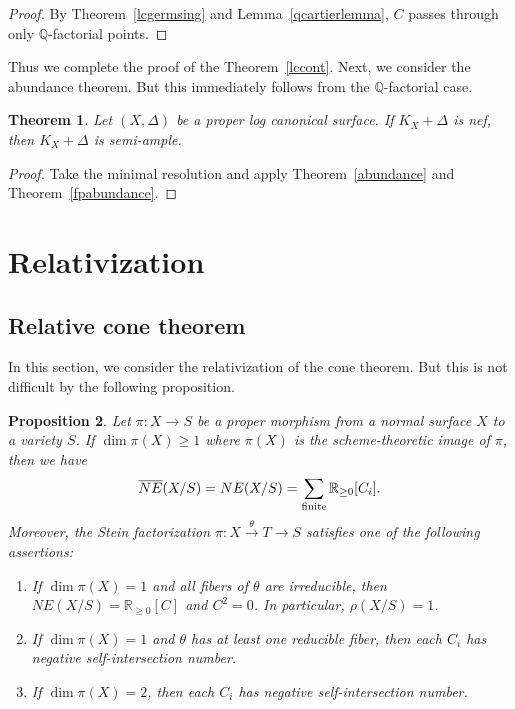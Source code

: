 \documentclass[12pt,twoside]{amsart}
\newtheorem{thm}{Theorem}[section]
\newtheorem{prop}[thm]{Proposition}
\theoremstyle{definition}
\newcommand{\Q}{$\mathbb{Q}$}
\begin{document}
\begin{proof}
By Theorem~\ref{lcgermsing} and Lemma~\ref{qcartierlemma}, 
$C$ passes through only \Q-factorial points. 
\end{proof}

Thus we complete the proof of the Theorem~\ref{lccont}.
Next, we consider the abundance theorem. 
But this immediately follows from the \Q-factorial case. 

\begin{thm}
Let $(X, \Delta)$ be a proper log canonical surface. 
If $K_X+\Delta$ is nef, then $K_X+\Delta$ is semi-ample. 
\end{thm}

\begin{proof}
Take the minimal resolution and apply Theorem~\ref{abundance} and 
Theorem~\ref{fpabundance}. 
\end{proof}



\section{Relativization}

\subsection{Relative cone theorem}

In this section, we consider the relativization of the cone theorem. 
But this is not difficult by the following proposition. 

\begin{prop}\label{relctt}
Let $\pi:X \to S$ be a proper morphism 
from a normal surface $X$ 
to a variety $S$. 
If $\dim \pi(X) \geq 1$ 
where $\pi(X)$ is the scheme-theoretic image of $\pi$, 
then we have 
$$\overline{NE}(X/S)=NE(X/S)=\sum\limits_{\rm finite}\mathbb{R}_{\geq 0}[C_i].$$ 
Moreover, 
the Stein factorization $\pi:X \overset{\theta}\to T \to S$ satisfies 
one of the following assertions{\em{:}} 
\begin{enumerate}
\item[(1-irr)]{If $\dim \pi(X)=1$ and all fibers of $\theta$ are irreducible, 
then $NE(X/S)=\mathbb{R}_{\geq 0}[C]$ and $C^2=0$. 
In particular, $\rho(X/S)=1$.}
\item[(1-red)]{If $\dim \pi(X)=1$ and $\theta$ has at least one reducible fiber, 
then each $C_i$ has negative self-intersection number.}
\item[(2)]{If $\dim \pi(X)=2$, 
then each $C_i$ has negative self-intersection number.}
\end{enumerate}
\end{prop}
\end{document}
